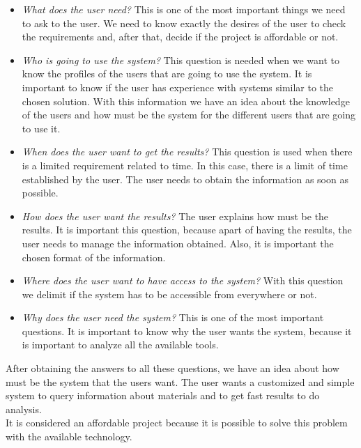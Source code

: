\begin{itemize}

\item \textit{What does the user need?} This is one of the most important things we need to ask to the user. We need to know exactly the desires of the user to check the requirements and, after that, decide if the project is affordable or not.

\item \textit{Who is going to use the system?} This question is needed when we want to know the profiles of the users that are going to use the system. It is important to know if the user has experience with systems similar to the chosen solution. With this information we have an idea about the knowledge of the users and how must be the system for the different users that are going to use it.

\item \textit{When does the user want to get the results?} This question is used when there is a limited requirement related to time. In this case, there is a limit of time established by the user. The user needs to obtain the information as soon as possible.

\item \textit{How does the user want the results?} The user explains how must be the results. It is important this question, because apart of having the results, the user needs to manage the information obtained. Also, it is important the chosen format of the information.

\item \textit{Where does the user want to have access to the system?} With this question we delimit if the system has to be accessible from everywhere or not.

\item \textit{Why does the user need the system?} This is one of the most important questions. It is important to know why the user wants the system, because it is important to analyze all the available tools.

\end{itemize}

After obtaining the answers to all these questions, we have an idea about how must be the system that the users want. The user wants a customized and simple system to query information about materials and to get fast results to do analysis.\\

It is considered an affordable project because it is possible to solve this problem with the available technology.

